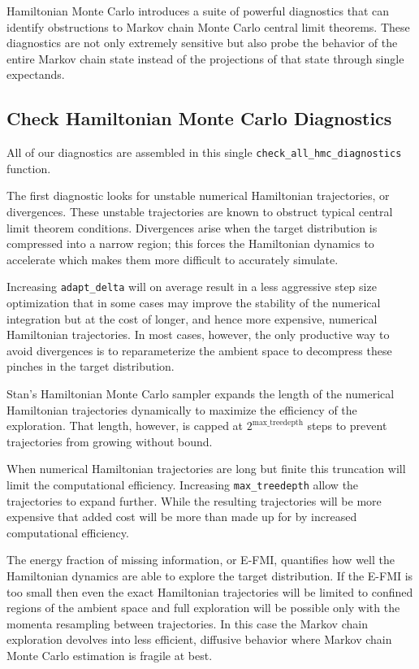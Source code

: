 \documentclass[
  letterpaper,
  DIV=11,
  numbers=noendperiod]{scrartcl}
\begin{document}
Hamiltonian Monte Carlo introduces a suite of powerful diagnostics that
can identify obstructions to Markov chain Monte Carlo central limit
theorems. These diagnostics are not only extremely sensitive but also
probe the behavior of the entire Markov chain state instead of the
projections of that state through single expectands.

\subsection{Check Hamiltonian Monte Carlo
Diagnostics}\label{check-hamiltonian-monte-carlo-diagnostics}

All of our diagnostics are assembled in this single
\texttt{check\_all\_hmc\_diagnostics} function.

The first diagnostic looks for unstable numerical Hamiltonian
trajectories, or divergences. These unstable trajectories are known to
obstruct typical central limit theorem conditions. Divergences arise
when the target distribution is compressed into a narrow region; this
forces the Hamiltonian dynamics to accelerate which makes them more
difficult to accurately simulate.

Increasing \texttt{adapt\_delta} will on average result in a less
aggressive step size optimization that in some cases may improve the
stability of the numerical integration but at the cost of longer, and
hence more expensive, numerical Hamiltonian trajectories. In most cases,
however, the only productive way to avoid divergences is to
reparameterize the ambient space to decompress these pinches in the
target distribution.

Stan's Hamiltonian Monte Carlo sampler expands the length of the
numerical Hamiltonian trajectories dynamically to maximize the
efficiency of the exploration. That length, however, is capped at
\(2^{\text{max\_treedepth}}\) steps to prevent trajectories from growing
without bound.

When numerical Hamiltonian trajectories are long but finite this
truncation will limit the computational efficiency. Increasing
\texttt{max\_treedepth} allow the trajectories to expand further. While
the resulting trajectories will be more expensive that added cost will
be more than made up for by increased computational efficiency.

The energy fraction of missing information, or E-FMI, quantifies how
well the Hamiltonian dynamics are able to explore the target
distribution. If the E-FMI is too small then even the exact Hamiltonian
trajectories will be limited to confined regions of the ambient space
and full exploration will be possible only with the momenta resampling
between trajectories. In this case the Markov chain exploration devolves
into less efficient, diffusive behavior where Markov chain Monte Carlo
estimation is fragile at best.
\end{document}
